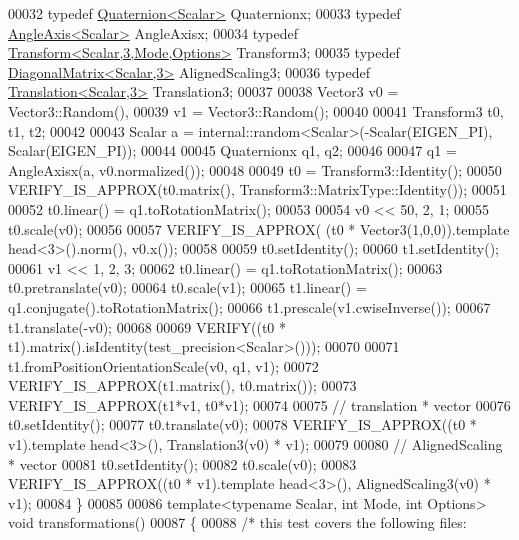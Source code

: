 \begin{DoxyCode}
00032   \textcolor{keyword}{typedef} \hyperlink{group___geometry___module_class_eigen_1_1_quaternion}{Quaternion<Scalar>} Quaternionx;
00033   \textcolor{keyword}{typedef} \hyperlink{group___geometry___module_class_eigen_1_1_angle_axis}{AngleAxis<Scalar>} AngleAxisx;
00034   \textcolor{keyword}{typedef} \hyperlink{group___geometry___module_class_eigen_1_1_transform}{Transform<Scalar,3,Mode,Options>} Transform3;
00035   \textcolor{keyword}{typedef} \hyperlink{group___core___module_class_eigen_1_1_diagonal_matrix}{DiagonalMatrix<Scalar,3>} AlignedScaling3;
00036   \textcolor{keyword}{typedef} \hyperlink{group___geometry___module_class_eigen_1_1_translation}{Translation<Scalar,3>} Translation3;
00037 
00038   Vector3 v0 = Vector3::Random(),
00039           v1 = Vector3::Random();
00040 
00041   Transform3 t0, t1, t2;
00042 
00043   Scalar a = internal::random<Scalar>(-Scalar(EIGEN\_PI), Scalar(EIGEN\_PI));
00044 
00045   Quaternionx q1, q2;
00046 
00047   q1 = AngleAxisx(a, v0.normalized());
00048 
00049   t0 = Transform3::Identity();
00050   VERIFY\_IS\_APPROX(t0.matrix(), Transform3::MatrixType::Identity());
00051 
00052   t0.linear() = q1.toRotationMatrix();
00053 
00054   v0 << 50, 2, 1;
00055   t0.scale(v0);
00056 
00057   VERIFY\_IS\_APPROX( (t0 * Vector3(1,0,0)).\textcolor{keyword}{template} head<3>().norm(), v0.x());
00058 
00059   t0.setIdentity();
00060   t1.setIdentity();
00061   v1 << 1, 2, 3;
00062   t0.linear() = q1.toRotationMatrix();
00063   t0.pretranslate(v0);
00064   t0.scale(v1);
00065   t1.linear() = q1.conjugate().toRotationMatrix();
00066   t1.prescale(v1.cwiseInverse());
00067   t1.translate(-v0);
00068 
00069   VERIFY((t0 * t1).matrix().isIdentity(test\_precision<Scalar>()));
00070 
00071   t1.fromPositionOrientationScale(v0, q1, v1);
00072   VERIFY\_IS\_APPROX(t1.matrix(), t0.matrix());
00073   VERIFY\_IS\_APPROX(t1*v1, t0*v1);
00074 
00075   \textcolor{comment}{// translation * vector}
00076   t0.setIdentity();
00077   t0.translate(v0);
00078   VERIFY\_IS\_APPROX((t0 * v1).\textcolor{keyword}{template} head<3>(), Translation3(v0) * v1);
00079 
00080   \textcolor{comment}{// AlignedScaling * vector}
00081   t0.setIdentity();
00082   t0.scale(v0);
00083   VERIFY\_IS\_APPROX((t0 * v1).\textcolor{keyword}{template} head<3>(), AlignedScaling3(v0) * v1);
00084 \}
00085 
00086 \textcolor{keyword}{template}<\textcolor{keyword}{typename} Scalar, \textcolor{keywordtype}{int} Mode, \textcolor{keywordtype}{int} Options> \textcolor{keywordtype}{void} transformations()
00087 \{
00088   \textcolor{comment}{/* this test covers the following files:}

\end{DoxyCode}
